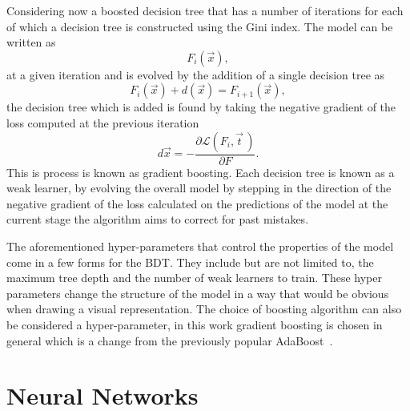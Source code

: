 Considering now a boosted decision tree that has a number of iterations for each
of which a decision tree is constructed using the Gini index. The model can be
written as
\begin{equation}
  F_i(\vec{x}),
\end{equation}
at a given iteration and is evolved by the addition of a single decision tree as
\begin{equation}
  F_i({\vec{x}}) + d(\vec{x}) = F_{i+1}(\vec{x}),
\end{equation}
the decision tree which is added is found by taking the negative gradient of the
loss computed at the previous iteration
\begin{equation}
  d{\vec{x}} = - \frac{\partial \mathcal{L}(F_i, \vec{t} \,)}{\partial F}.
\end{equation}
This is process is known as gradient boosting. Each decision tree is known as a
weak learner, by evolving the overall model by stepping in the direction of the
negative gradient of the loss calculated on the predictions of the model at the
current stage the algorithm aims to correct for past mistakes.

The aforementioned hyper-parameters that control the properties of the model
come in a few forms for the BDT. They include but are not limited to, the
maximum tree depth and the number of weak learners to train. These hyper
parameters change the structure of the model in a way that would be obvious when
drawing a visual representation. The choice of boosting algorithm can also be
considered a hyper-parameter, in this work gradient boosting is chosen in
general which is a change from the previously popular AdaBoost~\cite{AdaBoost}. 

\section{Neural Networks}%

\label{sec:neural-networks}


